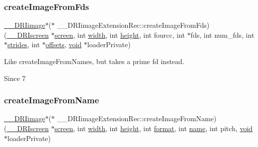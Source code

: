 \subsubsection{\texorpdfstring{create\+Image\+From\+Fds}{createImageFromFds}}
{\footnotesize\ttfamily \hyperlink{dri__interface_8h_a37e0407153595dc88fe5d25127645cf1}{\+\_\+\+\_\+\+D\+R\+Iimage}$\ast$($\ast$ \+\_\+\+\_\+\+D\+R\+Iimage\+Extension\+Rec\+::create\+Image\+From\+Fds) (\hyperlink{dri__interface_8h_a9961b01d421ee1fd6ed3c05acc9ca561}{\+\_\+\+\_\+\+D\+R\+Iscreen} $\ast$\hyperlink{cad_8h_ae04e09e4e3831bfc1632c509ae37dcec}{screen}, int \hyperlink{gl_8h_a9a82cf3caff84cabc4598e2619faac17}{width}, int \hyperlink{gl_8h_aa352f2804b9902ac30769c00dde75d5f}{height}, int fourcc, int $\ast$fds, int num\+\_\+fds, int $\ast$\hyperlink{glcorearb_8h_abdc1551331dfc83183e1c34542207728}{strides}, int $\ast$\hyperlink{glcorearb_8h_a1b4d6c0d4a1eb8b693aa458f455ed705}{offsets}, \hyperlink{_s_d_l__opengles2__gl2ext_8h_ae5d8fa23ad07c48bb609509eae494c95}{void} $\ast$loader\+Private)}

Like create\+Image\+From\+Names, but takes a prime fd instead.

\begin{DoxySince}{Since}
7 
\end{DoxySince}
\mbox{\label{struct_____d_r_iimage_extension_rec_ae37aa83d91973f4d86e3bb6a34d1ca7b}} 
\subsubsection{\texorpdfstring{create\+Image\+From\+Name}{createImageFromName}}
{\footnotesize\ttfamily \hyperlink{dri__interface_8h_a37e0407153595dc88fe5d25127645cf1}{\+\_\+\+\_\+\+D\+R\+Iimage}$\ast$($\ast$ \+\_\+\+\_\+\+D\+R\+Iimage\+Extension\+Rec\+::create\+Image\+From\+Name) (\hyperlink{dri__interface_8h_a9961b01d421ee1fd6ed3c05acc9ca561}{\+\_\+\+\_\+\+D\+R\+Iscreen} $\ast$\hyperlink{cad_8h_ae04e09e4e3831bfc1632c509ae37dcec}{screen}, int \hyperlink{gl_8h_a9a82cf3caff84cabc4598e2619faac17}{width}, int \hyperlink{gl_8h_aa352f2804b9902ac30769c00dde75d5f}{height}, int \hyperlink{gl_8h_a71a65ffd977afe9c3fef116a5bc9ee27}{format}, int \hyperlink{glcorearb_8h_aaced7cfc21e7d37775d6921bb8177239}{name}, int pitch, \hyperlink{_s_d_l__opengles2__gl2ext_8h_ae5d8fa23ad07c48bb609509eae494c95}{void} $\ast$loader\+Private)}

